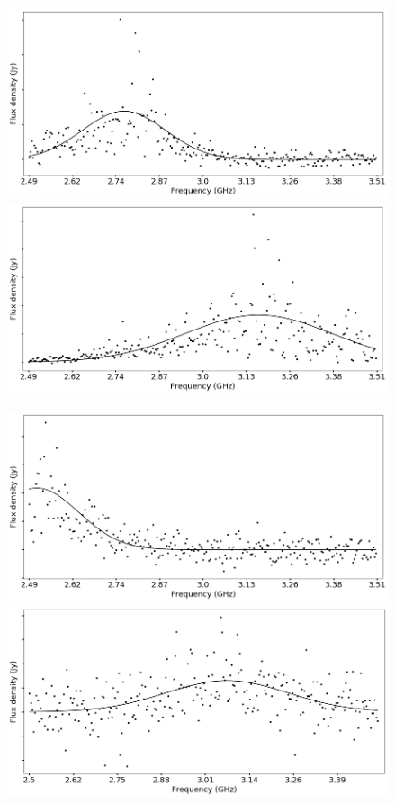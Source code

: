 \documentclass[twocolumn]{aastex61}
\begin{document}



\begin{figure}[ht]
\begin{center}
 \begin{minipage}{2\columnwidth}
  \includegraphics[width=0.5\columnwidth]{spec_57623.png}
  \includegraphics[width=0.5\columnwidth]{spec_57633_scan7.png}
 \end{minipage}

 \begin{minipage}{2\columnwidth}
  \includegraphics[width=0.5\columnwidth]{spec_57633_scan13.png}
  \includegraphics[width=0.5\columnwidth]{spec_57638.png}
 \end{minipage}


\end{center}
\end{figure}
\end{document}
